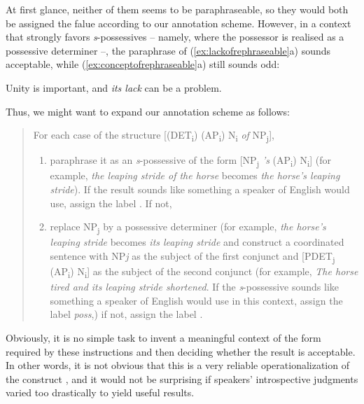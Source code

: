 At first glance, neither of them seems to be paraphraseable, so they would both be assigned the falue  according to our annotation scheme. However, in a context that strongly favors \textit{s}-possessives -- namely, where the possessor is realised as a possessive determiner --, the paraphrase of (\ref{ex:lackofrephraseable}a) sounds acceptable, while (\ref{ex:conceptofrephraseable}a) still sounds odd:

\begin{exe}
\ex
\begin{xlist}
\label{ex:ofpronrephraseable}
\ex Unity is important, and \textit{its lack} can be a problem.
\end{xlist}
\end{exe}

Thus, we might want to expand our annotation scheme as follows:

\begin{quote}
For each case of the structure [(DET\textsubscript{i}) (AP\textsubscript{i}) N\textsubscript{i} \textit{of} NP\textsubscript{j}],
\begin{enumerate}
\item paraphrase it as an \textit{s}-possessive of the form [NP\textsubscript{j} \textit{'s} (AP\textsubscript{i}) N\textsubscript{i}] (for example, \textit{the leaping stride of the horse} becomes \textit{the horse's leaping stride}). If the result sounds like something a speaker of English would use, assign the label . If not,
\item replace NP\textsubscript{j} by a possessive determiner (for example, \textit{the horse's leaping stride} becomes \textit{its leaping stride} and construct a coordinated sentence with NP\textit{j} as the subject of the first conjunct and [PDET\textsubscript{j} (AP\textsubscript{i}) N\textsubscript{i}] as the subject of the second conjunct (for example, \textit{The horse tired and its leaping stride shortened}. If the \textit{s}-possessive sounds like something a speaker of English would use in this context, assign the label \textit{poss},) if not, assign the label .
\end{enumerate}
\end{quote}

Obviously, it is no simple task to invent a meaningful context of the form required by these instructions and then deciding whether the result is acceptable. In other words, it is not obvious that this is a very reliable operationalization of the construct , and it would not be surprising if speakers' introspective judgments varied too drastically to yield useful results.

